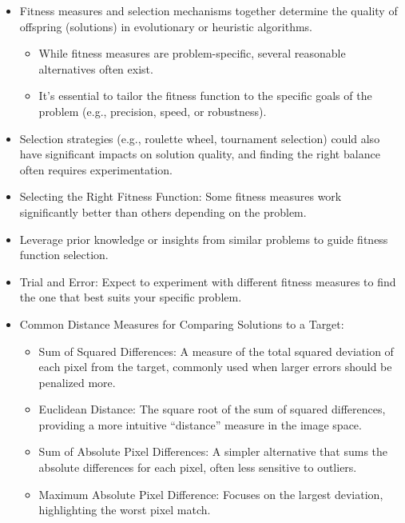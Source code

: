 \documentclass[
  letterpaper,
  DIV=11,
  numbers=noendperiod]{scrreprt}
\providecommand{\tightlist}{%
  \setlength{\itemsep}{0pt}\setlength{\parskip}{0pt}}\usepackage{longtable,booktabs,array}
\begin{document}
\begin{itemize}
\item
  Fitness measures and selection mechanisms together determine the
  quality of offspring (solutions) in evolutionary or heuristic
  algorithms.

  \begin{itemize}
  \tightlist
  \item
    While fitness measures are problem-specific, several reasonable
    alternatives often exist.
  \item
    It's essential to tailor the fitness function to the specific goals
    of the problem (e.g., precision, speed, or robustness).
  \end{itemize}
\item
  Selection strategies (e.g., roulette wheel, tournament selection)
  could also have significant impacts on solution quality, and finding
  the right balance often requires experimentation.
\item
  Selecting the Right Fitness Function: Some fitness measures work
  significantly better than others depending on the problem.
\item
  Leverage prior knowledge or insights from similar problems to guide
  fitness function selection.
\item
  Trial and Error: Expect to experiment with different fitness measures
  to find the one that best suits your specific problem.
\item
  Common Distance Measures for Comparing Solutions to a Target:

  \begin{itemize}
  \tightlist
  \item
    Sum of Squared Differences: A measure of the total squared deviation
    of each pixel from the target, commonly used when larger errors
    should be penalized more.
  \item
    Euclidean Distance: The square root of the sum of squared
    differences, providing a more intuitive ``distance'' measure in the
    image space.
  \item
    Sum of Absolute Pixel Differences: A simpler alternative that sums
    the absolute differences for each pixel, often less sensitive to
    outliers.
  \item
    Maximum Absolute Pixel Difference: Focuses on the largest deviation,
    highlighting the worst pixel match.
  \end{itemize}
\end{itemize}
\end{document}
